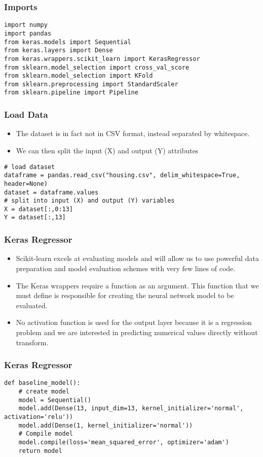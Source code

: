 \begin{frame}[fragile] \frametitle{Imports}
\begin{lstlisting}
import numpy
import pandas
from keras.models import Sequential
from keras.layers import Dense
from keras.wrappers.scikit_learn import KerasRegressor
from sklearn.model_selection import cross_val_score
from sklearn.model_selection import KFold
from sklearn.preprocessing import StandardScaler
from sklearn.pipeline import Pipeline
\end{lstlisting}
\end{frame}

\begin{frame}[fragile] \frametitle{Load Data}
 \begin{itemize}
 \item The dataset is in fact not in CSV format, instead separated by whitespace. 
 \item We can then split the input (X) and output (Y) attributes
 \end{itemize}
\begin{lstlisting}
# load dataset
dataframe = pandas.read_csv("housing.csv", delim_whitespace=True, header=None)
dataset = dataframe.values
# split into input (X) and output (Y) variables
X = dataset[:,0:13]
Y = dataset[:,13]
\end{lstlisting}
\end{frame}


\begin{frame}[fragile] \frametitle{Keras Regressor}
 \begin{itemize}
 \item Scikit-learn excels at evaluating models and will allow us to use powerful data preparation and model evaluation schemes with very few lines of code.
 \item The Keras wrappers require a function as an argument. This function that we must define is responsible for creating the neural network model to be evaluated.
 \item No activation function is used for the output layer because it is a regression problem and we are interested in predicting numerical values directly without transform.
 \end{itemize}
\end{frame}


\begin{frame}[fragile] \frametitle{Keras Regressor}
 \begin{lstlisting}
def baseline_model():
	# create model
	model = Sequential()
	model.add(Dense(13, input_dim=13, kernel_initializer='normal', activation='relu'))
	model.add(Dense(1, kernel_initializer='normal'))
	# Compile model
	model.compile(loss='mean_squared_error', optimizer='adam')
	return model
\end{lstlisting}
\end{frame}



